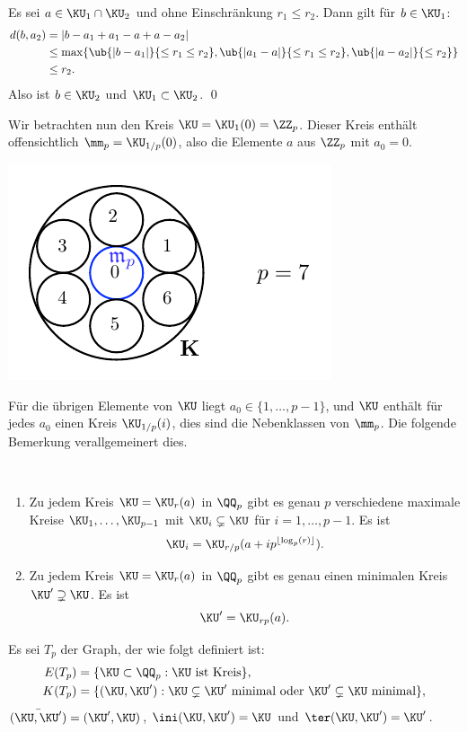 \bew Es sei $a\in \KU_1\cap\KU_2$ und ohne Einschränkung
$r_1\leq r_2$. Dann gilt für $b\in \KU_1$:
\begin{align*}
d(b,a_2) &= |b-a_1+a_1-a+a-a_2| \\
&\leq \max\{\ub{|b-a_1|}{\leq r_1\leq r_2},
\ub{|a_1-a|}{\leq r_1\leq r_2},
\ub{|a-a_2|}{\leq r_2}\} \\
&\leq r_2.
\end{align*}
Also ist $b\in \KU_2$ und $\KU_1\subset \KU_2$.
\qed

Wir betrachten nun den Kreis $\KU=\KU_1(0)=\ZZ_p$.
Dieser Kreis enthält offensichtlich $\mm_p=\KU_{1/p}(0)$, also
die Elemente $a$ aus $\ZZ_p$ mit $a_0=0$.
\begin{center}
	\includegraphics{grugraImages/kreisQp}
\end{center}
Für die übrigen Elemente von $\KU$ liegt $a_0\in\{1,\ldots,p-1\}$,
und $\KU$ enthält für jedes $a_0$ einen Kreis $\KU_{1/p}(i)$, dies
sind die Nebenklassen von $\mm_p$.
Die folgende Bemerkung verallgemeinert dies.

\BEM\ \label{bem_kreisQp}
\begin{enumerate}
\item Zu jedem Kreis $\KU=\KU_r(a)$ in $\QQ_p$ gibt es genau $p$
verschiedene maximale Kreise $\KU_1,\ldots,\KU_{p-1}$ mit
$\KU_i\subsetneq \KU$ für $i=1,\ldots,p-1$.
Es ist
\[
\KU_i = \KU_{r/p}(a+i p^{\lfloor\log_p(r)\rfloor}).
\]
\item Zu jedem Kreis $\KU=\KU_r(a)$ in $\QQ_p$ gibt es genau einen
minimalen Kreis $\KU'\supsetneq \KU$. Es ist
\[
\KU' = \KU_{rp}(a).
\]
\end{enumerate}

\DEF Es sei $T_p$ der Graph, der wie folgt definiert ist:
\begin{align*}
E(T_p) &= \{ \KU\subset\QQ_p : \KU \text{ ist Kreis} \}, \\
K(T_p) &= \{ (\KU,\KU') : \KU\subsetneq \KU' \text{ minimal oder }
\KU'\subsetneq \KU \text{ minimal} \},
\end{align*}
$\bar{(\KU,\KU')}=(\KU',\KU)$, $\ini(\KU,\KU')=\KU$ und
$\ter(\KU,\KU')=\KU'$.

